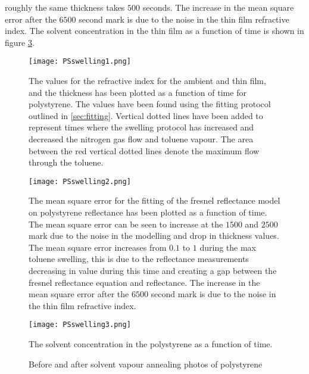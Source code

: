 \documentclass[MasterThesisMain.tex]{subfiles}
\begin{document}
roughly the same thickness takes $500$ seconds. The increase in the mean square error after the $6500$ second mark is due to the noise in the thin film refractive index. The solvent concentration in the thin film as a function of time is shown in figure \ref{fig:PSswelling3}.        

\begin{figure}
\centering
\texttt{[image: PSswelling1.png]}
\caption{The values for the refractive index for the ambient and thin film, and the thickness has been plotted as a function of time for polystyrene. The values have been found using the fitting protocol outlined in \ref{sec:fitting}. Vertical dotted lines have been added to represent times where the swelling protocol has increased and decreased the nitrogen gas flow and toluene vapour. The area between the red vertical dotted lines denote the maximum flow through the toluene.}
\label{fig:PSswelling1}
\end{figure}


\begin{figure}
\centering
\texttt{[image: PSswelling2.png]}
\caption{The mean square error for the fitting of the fresnel reflectance model on polystyrene reflectance has been plotted as a function of time. The mean square error can be seen to increase at the $1500$ and $2500$ mark due to the noise in the modelling and drop in thickness values. The mean square error increases from $0.1$ to $1$ during the max toluene swelling, this is due to the reflectance measurements decreasing in value during this time and creating a gap between the fresnel reflectance equation and reflectance. The increase in the mean square error after the $6500$ second mark is due to the noise in the thin film refractive index.}
\label{fig:PSswelling2}
\end{figure}

\begin{figure}
\centering
\texttt{[image: PSswelling3.png]}
\caption{The solvent concentration in the polystyrene as a function of time.}
\label{fig:PSswelling3}
\end{figure}

\begin{figure}
\centering     
{}
\caption{Before and after solvent vapour annealing photos of polystyrene}
\end{figure}
	
\end{document}
